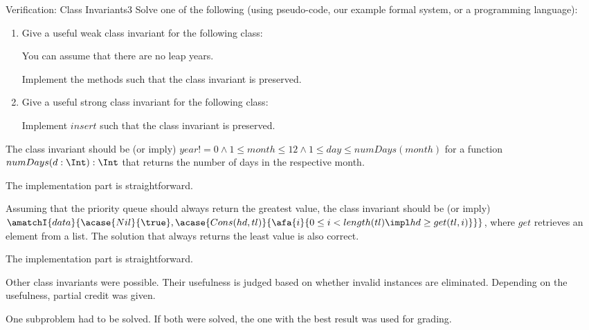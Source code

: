 \documentclass[a4paper]{article}
\begin{document}
\begin{problem}{Verification: Class Invariants}{3}
Solve one of the following (using pseudo-code, our example formal system, or a programming language):

\begin{enumerate}
\item Give a useful weak class invariant for the following class:

\begin{acode}
\end{acode}
You can assume that there are no leap years.

Implement the methods such that the class invariant is preserved.

\item Give a useful strong class invariant for the following class:
\begin{acode}
\end{acode}

Implement $insert$ such that the class invariant is preserved.
\end{enumerate}

\begin{solution}
\begin{compactenum}
 \item The class invariant should be (or imply) $year!=0 \wedge 1\leq month\leq 12 \wedge 1\leq day\leq numDays(month)$ for a function $numDays(d:\Int):\Int$ that returns the number of days in the respective month.
 
 The implementation part is straightforward.
 \item Assuming that the priority queue should always return the greatest value, the class invariant should be (or imply) $\amatchI{data}{\acase{Nil}{\true},\acase{Cons(hd,tl)}{\afa{i}{0\leq i< length(tl)\impl hd\geq get(tl,i)}}}$, where $get$ retrieves an element from a list.
 The solution that always returns the least value is also correct.

 The implementation part is straightforward.
\end{compactenum}
Other class invariants were possible. Their usefulness is judged based on whether invalid instances are eliminated. Depending on the usefulness, partial credit was given.

One subproblem had to be solved. If both were solved, the one with the best result was used for grading.
\end{solution}
\end{problem}
\end{document}
